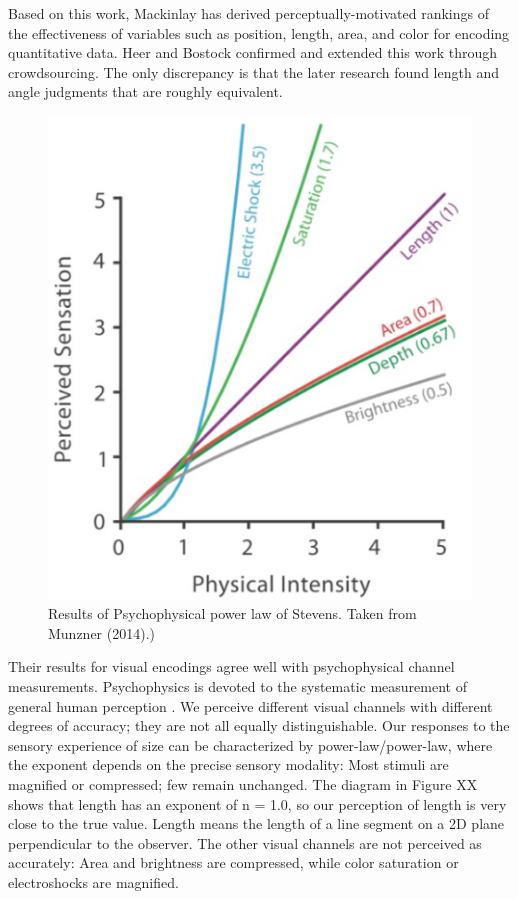 \documentclass[
]{book}
\begin{document}
Based on this work, Mackinlay \citep{Mackinlay1986automatingdesign} has derived perceptually-motivated rankings of the effectiveness of variables such as position, length, area, and color for encoding quantitative data. Heer and Bostock \citep{HeerBostock2010crowdsourcing} confirmed and extended this work through crowdsourcing. The only discrepancy is that the later research found length and angle judgments that are roughly equivalent.

\begin{figure}

{\centering \includegraphics[width=0.5\linewidth]{images/stevens_psychophysicalpowerlaw} 

}

\caption{Results of Psychophysical power law of Stevens. Taken from Munzner (2014).)}\label{fig:unnamed-chunk-10}
\end{figure}

Their results for visual encodings agree well with psychophysical channel measurements. Psychophysics is devoted to the systematic measurement of general human perception \citep{StevensMarks2017Psychophysics}. We perceive different visual channels with different degrees of accuracy; they are not all equally distinguishable. Our responses to the sensory experience of size can be characterized by power-law/power-law, where the exponent depends on the precise sensory modality: Most stimuli are magnified or compressed; few remain unchanged. The diagram in Figure XX shows that length has an exponent of n = 1.0, so our perception of length is very close to the true value. Length means the length of a line segment on a 2D plane perpendicular to the observer. The other visual channels are not perceived as accurately: Area and brightness are compressed, while color saturation or electroshocks are magnified.
\end{document}

